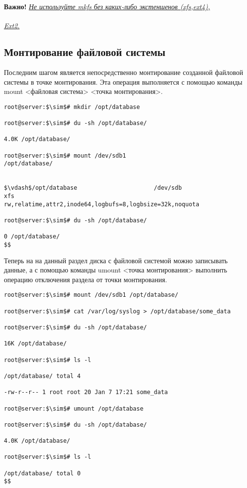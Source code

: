 \documentclass[14pt, a4paper]{article}
\begin{document}
\vspace{0.3cm}

\textbf{Важно!} \underline{\textit{Не используйте mkfs без каких-либо экстеншенов (xfs,ext4),}} \\
\underline{} \\
\underline{\textit{Ext2.}}

\newpage

\subsection*{Монтирование файловой системы} 

Последним шагом является непосредственно монтирование созданной файловой системы в точке
монтирования. Эта операция выполняется с помощью команды \colorbox{backcolour}{mount <файловая система>
<точка монтирования>}.

\vspace{0.3cm}

\begin{lstlisting}
root@server:$\sim$# mkdir /opt/database

root@server:$\sim$# du -sh /opt/database/

4.0K /opt/database/

root@server:$\sim$# mount /dev/sdb1
/opt/database/


$\vdash$/opt/database                      /dev/sdb                        xfs
rw,relatime,attr2,inode64,logbufs=8,logbsize=32k,noquota

root@server:$\sim$# du -sh /opt/database/

0 /opt/database/
$$
\end{lstlisting}
\vspace{0.2cm}

Теперь на на данный раздел диска с файловой системой можно записывать данные, а с помощью
команды \colorbox{backcolour}{umount <точка монтирования>} выполнить операцию отключения раздела от точки
монтирования.

\vspace{0.3cm}
\begin{lstlisting}
root@server:$\sim$# mount /dev/sdb1 /opt/database/

root@server:$\sim$# cat /var/log/syslog > /opt/database/some_data

root@server:$\sim$# du -sh /opt/database/

16K /opt/database/

root@server:$\sim$# ls -l

/opt/database/ total 4

-rw-r--r-- 1 root root 20 Jan 7 17:21 some_data

root@server:$\sim$# umount /opt/database

root@server:$\sim$# du -sh /opt/database/

4.0K /opt/database/

root@server:$\sim$# ls -l

/opt/database/ total 0
$$
\end{lstlisting}
\vspace{0.2cm}
\end{document}
